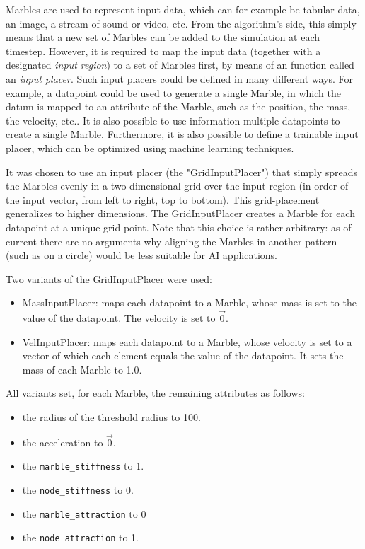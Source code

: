 Marbles are used to represent input data, which can for example be tabular data, an image, a stream of sound or video, etc.
From the algorithm's side,
this simply means that a new set of Marbles can be added to the simulation at each timestep.
However, it is required to map the input data (together with a designated \textit{input region}) to a set of Marbles first, by means of an function called an \textit{input placer}.
Such input placers could be defined in many different ways. 
For example, a datapoint could be used to generate a single Marble, in which the datum is mapped to an attribute of the Marble, such as the position, the mass, the velocity, etc..
It is also possible to use information multiple datapoints to create a single Marble.
Furthermore, it is also possible to define a trainable input placer, which can be optimized using machine learning techniques.

It was chosen to use an input placer (the "GridInputPlacer") that simply spreads the Marbles evenly in a two-dimensional grid over the input region (in order of the input vector, from left to right, top to bottom). This grid-placement generalizes to higher dimensions. The GridInputPlacer creates a Marble for each datapoint at a unique grid-point.
Note that this choice is rather arbitrary: as of current there are no arguments why aligning the Marbles in another pattern (such as on a circle) would be less suitable for AI applications.

Two variants of the GridInputPlacer were used:
\begin{itemize}
	\item MassInputPlacer: maps each datapoint to a Marble, whose mass is set to the value of the datapoint. The velocity is set to $\vec{0}$.
	\item VelInputPlacer: maps each datapoint to a Marble, whose velocity is set to a vector of which each element equals the value of the datapoint. It sets the mass of each Marble to 1.0.
\end{itemize}

All variants set, for each Marble, the remaining attributes as follows:
\begin{itemize}
	\item the radius of the threshold radius to 100.
	\item the acceleration to $\vec{0}$.
	\item the \texttt{marble\_stiffness} to 1.
	\item the \texttt{node\_stiffness} to 0.
	\item the \texttt{marble\_attraction} to 0
	\item the \texttt{node\_attraction} to 1.
\end{itemize}

